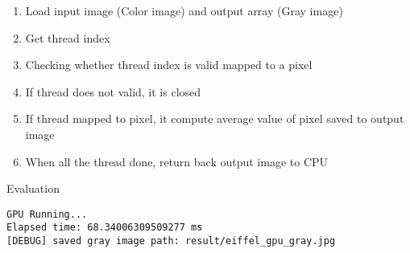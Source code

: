 \documentclass{report}
\begin{document}
\begin{enumerate}
    \item Load input image (Color image) and output array (Gray image)
    \item Get thread index
    \item Checking whether thread index is valid mapped to a pixel
    \item If thread does not valid, it is closed
    \item If thread mapped to pixel, it compute average value of pixel saved to output image
    \item When all the thread done, return back output image to CPU
\end{enumerate}

Evaluation

\begin{verbatim}
GPU Running...
Elapsed time: 68.34006309509277 ms
[DEBUG] saved gray image path: result/eiffel_gpu_gray.jpg
\end{verbatim}
\end{document}
